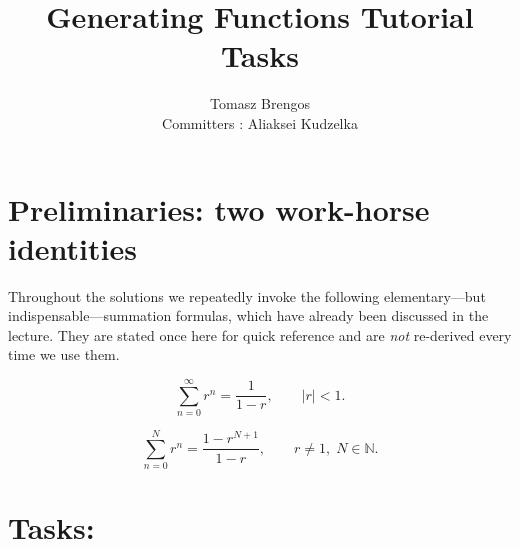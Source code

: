 \documentclass[docmute]{article}
\title{Generating Functions Tutorial Tasks}
\author{Tomasz Brengos \\  
Committers : Aliaksei Kudzelka}
\date{}
\begin{document}

\section*{Preliminaries: two work-horse identities}

Throughout the solutions we repeatedly invoke the following elementary—but
indispensable—summation formulas, which have already been discussed in the lecture.
They are stated once here for quick reference and are \emph{not} re-derived every time
we use them.

\begin{description}[leftmargin=1.4cm,labelsep=0.5cm]
  \item[Infinite geometric series] 
  \begin{equation}\label{eq:geom-inf}
       \sum_{n=0}^{\infty} r^{n}= \frac{1}{1-r},
       \qquad |r|<1.
  \end{equation}

  \item[Finite geometric series] 
  \begin{equation}\label{eq:geom-fin}
       \sum_{n=0}^{N} r^{n}= \frac{1-r^{N+1}}{1-r},
       \qquad r\neq 1,\; N\in\mathbb N.
  \end{equation}
\end{description}


\section*{Tasks:}
\end{document}
